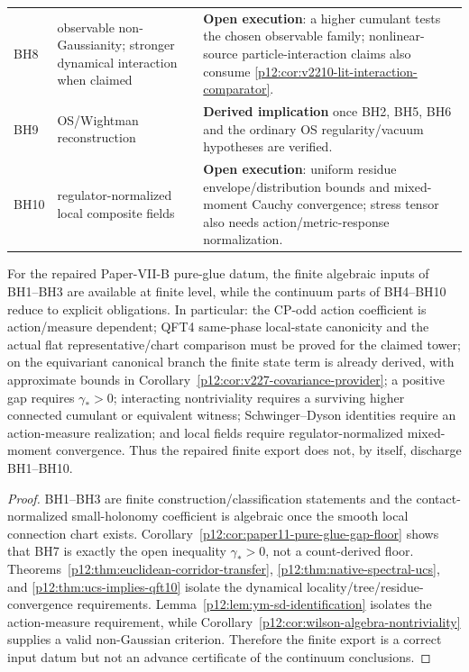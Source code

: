 \documentclass[12pt,a4paper]{article}
\begin{document}
\begin{longtable}{>{\raggedright\arraybackslash}p{} >{\raggedright\arraybackslash}p{} >{\raggedright\arraybackslash}p{}}
BH8 & observable non-Gaussianity; stronger dynamical interaction when claimed & \textbf{Open execution}: a higher cumulant tests the chosen observable family; nonlinear-source particle-interaction claims also consume \ref{p12:cor:v2210-lit-interaction-comparator}. \\
BH9 & OS/Wightman reconstruction & \textbf{Derived implication} once BH2, BH5, BH6 and the ordinary OS regularity/vacuum hypotheses are verified. \\
BH10 & regulator-normalized local composite fields & \textbf{Open execution}: uniform residue envelope/distribution bounds and mixed-moment Cauchy convergence; stress tensor also needs action/metric-response normalization. \\
\bottomrule
\end{longtable}

\begin{corollary}
\label{p12:cor:bh1-bh10-su3-discharge}
For the repaired Paper-VII-B pure-glue datum, the finite algebraic inputs of BH1--BH3 are available at finite level, while the continuum parts of BH4--BH10 reduce to explicit obligations.  In particular: the CP-odd action coefficient is action/measure dependent; QFT4 same-phase local-state canonicity and the actual flat representative/chart comparison must be proved for the claimed tower; on the equivariant canonical branch the finite state term is already derived, with approximate bounds in Corollary~\ref{p12:cor:v227-covariance-provider}; a positive gap requires \(\gamma_*>0\); interacting nontriviality requires a surviving higher connected cumulant or equivalent witness; Schwinger--Dyson identities require an action-measure realization; and local fields require regulator-normalized mixed-moment convergence.  Thus the repaired finite export does not, by itself, discharge BH1--BH10.
\end{corollary}
\begin{proof}
BH1--BH3 are finite construction/classification statements and the contact-normalized small-holonomy coefficient is algebraic once the smooth local connection chart exists.  Corollary~\ref{p12:cor:paper11-pure-glue-gap-floor} shows that BH7 is exactly the open inequality \(\gamma_*>0\), not a count-derived floor.  Theorems~\ref{p12:thm:euclidean-corridor-transfer}, \ref{p12:thm:native-spectral-ucs}, and \ref{p12:thm:ucs-implies-qft10} isolate the dynamical locality/tree/residue-convergence requirements.  Lemma~\ref{p12:lem:ym-sd-identification} isolates the action-measure requirement, while Corollary~\ref{p12:cor:wilson-algebra-nontriviality} supplies a valid non-Gaussian criterion.  Therefore the finite export is a correct input datum but not an advance certificate of the continuum conclusions.
\end{proof}
\end{document}
